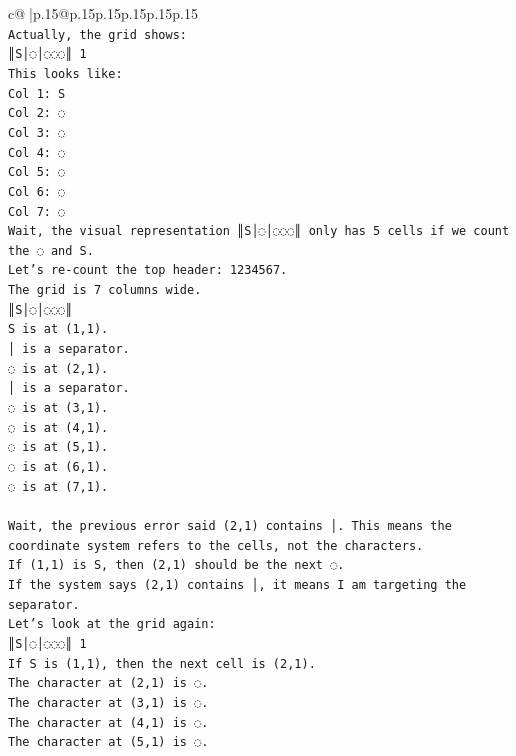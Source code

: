 \documentclass{article}
\begin{document}
{\begin{supertabular}{c@{$\;$}|p{.15\linewidth}@{}p{.15\linewidth}p{.15\linewidth}p{.15\linewidth}p{.15\linewidth}p{.15\linewidth}}
{{{\\ 
\texttt{Actually, the grid shows:} \\
\texttt{║S│◌│◌◌◌║ 1} \\
\texttt{This looks like:} \\
\texttt{Col 1: S} \\
\texttt{Col 2: ◌} \\
\texttt{Col 3: ◌} \\
\texttt{Col 4: ◌} \\
\texttt{Col 5: ◌} \\
\texttt{Col 6: ◌} \\
\texttt{Col 7: ◌} \\
\texttt{Wait, the visual representation ║S│◌│◌◌◌║ only has 5 cells if we count the ◌ and S.} \\
\texttt{Let's re{-}count the top header: 1234567.} \\
\texttt{The grid is 7 columns wide.} \\
\texttt{║S│◌│◌◌◌║} \\
\texttt{S is at (1,1).} \\
\texttt{│ is a separator.} \\
\texttt{◌ is at (2,1).} \\
\texttt{│ is a separator.} \\
\texttt{◌ is at (3,1).} \\
\texttt{◌ is at (4,1).} \\
\texttt{◌ is at (5,1).} \\
\texttt{◌ is at (6,1).} \\
\texttt{◌ is at (7,1).} \\
\\ 
\texttt{Wait, the previous error said (2,1) contains │. This means the coordinate system refers to the cells, not the characters.} \\
\texttt{If (1,1) is S, then (2,1) should be the next ◌.} \\
\texttt{If the system says (2,1) contains │, it means I am targeting the separator.} \\
\texttt{Let's look at the grid again:} \\
\texttt{║S│◌│◌◌◌║ 1} \\
\texttt{If S is (1,1), then the next cell is (2,1).} \\
\texttt{The character at (2,1) is ◌.} \\
\texttt{The character at (3,1) is ◌.} \\
\texttt{The character at (4,1) is ◌.} \\
\texttt{The character at (5,1) is ◌.} \\
}}}
\end{supertabular}}
\end{document}
